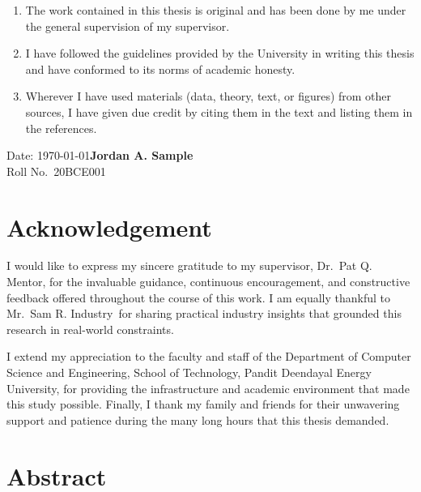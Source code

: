 \documentclass[12pt,a4paper,oneside]{report}
\newcommand{\thesisAuthor}{Jordan A. Sample}
\newcommand{\thesisRollNo}{20BCE001}
\newcommand{\thesisGuide}{Dr.\ Pat Q. Mentor}
\newcommand{\thesisCoGuide}{Mr.\ Sam R. Industry}
\newcommand{\thesisDepartment}{Computer Science and Engineering}
\newcommand{\thesisSchool}{School of Technology}
\newcommand{\thesisUniversity}{Pandit Deendayal Energy University}
\begin{document}
\begin{enumerate}[label=\arabic*., leftmargin=2.4em]
  \item The work contained in this thesis is original and has been done by me
        under the general supervision of my supervisor.
  \item I have followed the guidelines provided by the University in writing
        this thesis and have conformed to its norms of academic honesty.
  \item Wherever I have used materials (data, theory, text, or figures) from
        other sources, I have given due credit by citing them in the text and
        listing them in the references.
\end{enumerate}

\vspace{3cm}
\noindent Date: \today \hfill \textbf{\thesisAuthor}\\
\null \hfill Roll No.\ \thesisRollNo

\chapter*{Acknowledgement}
\thispagestyle{plain}

I would like to express my sincere gratitude to my supervisor, \thesisGuide,
for the invaluable guidance, continuous encouragement, and constructive
feedback offered throughout the course of this work. I am equally thankful to
\thesisCoGuide\ for sharing practical industry insights that grounded this
research in real-world constraints.

I extend my appreciation to the faculty and staff of the Department of
\thesisDepartment, \thesisSchool, \thesisUniversity, for providing the
infrastructure and academic environment that made this study possible.
Finally, I thank my family and friends for their unwavering support and
patience during the many long hours that this thesis demanded.

\chapter*{Abstract}
\thispagestyle{plain}
\end{document}
